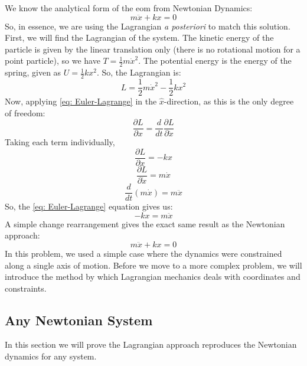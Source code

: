 \documentclass[10pt, openany, titlepage]{book}
\theoremstyle{definition}
\begin{document}
We know the analytical form of the \gls{eom} from Newtonian Dynamics:
$$m\ddot{x}+kx=0$$
So, in essence, we are using the \gls{Lagrangian} \textit{a posteriori} to match this solution. First, we will find the \gls{Lagrangian} of the system. The kinetic energy of the particle is given by the linear translation only (there is no rotational motion for a point particle), so we have $T=\frac{1}{2}m\dot{x}^2$. The potential energy is the energy of the spring, given as $U=\frac{1}{2}kx^2$. So, the \gls{Lagrangian} is:
$$L=\frac{1}{2}m\dot{x}^2-\frac{1}{2}kx^2$$
Now, applying \eqref{eq: Euler-Lagrange} in the $\hat{x}$-direction, as this is the only degree of freedom:
$$\frac{\partial L}{\partial x}=\frac{d}{dt}\frac{\partial L}{\partial \dot{x}}$$
Taking each term individually,
$$\frac{\partial L}{\partial x}=-kx$$
$$\frac{\partial L}{\partial \dot{x}}=m\dot{x}$$
$$\frac{d}{dt}\left(m\dot{x}\right)=m\ddot{x}$$
So, the \eqref{eq: Euler-Lagrange} equation gives us:
$$-kx=m\ddot{x}$$
A simple change rearrangement gives the exact same result as the Newtonian approach:
$$m\ddot{x}+kx=0$$
In this problem, we used a simple case where the dynamics were constrained along a single axis of motion. Before we move to a more complex problem, we will introduce the method by which \gls{Lagrangian} mechanics deals with coordinates and constraints.

\subsection{Any Newtonian System}

In this section we will prove the \gls{Lagrangian} approach reproduces the Newtonian dynamics for any system.
\end{document}
